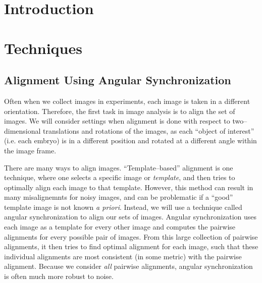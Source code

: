 \documentclass[12pt]{article}
\begin{document}
\section{Introduction}


\section{Techniques}


\subsection{Alignment Using Angular Synchronization}

Often when we collect images in experiments, each image is taken in a different orientation. 
%
Therefore, the first task in image analysis is to align the set of images. 
%
We will consider settings when alignment is done with respect to two--dimensional translations and rotations of the images, as each ``object of interest'' (i.e. each embryo) is in a different position and rotated at a different angle within the image frame. 


There are many ways to align images. 
%
``Template--based'' alignment \cite{...} is one technique, where one selects a specific image or {\em template}, and then tries to optimally align each image to that template.
%
However, this method can result in many misalignemnts for noisy images, and can be problematic if a ``good'' template image is not known {\em a priori}. 
%
Instead, we will use a technique called angular synchronization\cite{singer2011angular} to align our sets of images.
%
Angular synchronization uses each image as a template for every other image and computes the pairwise alignments for every possible pair of images.
%
From this large collection of pairwise alignments, it then tries to find optimal alignment for each image, such that these individual alignments are most consistent (in some metric) with the pairwise alignment.
%
Because we consider {\em all} pairwise alignments, angular synchronization is often much more robust to noise. 
\end{document}
